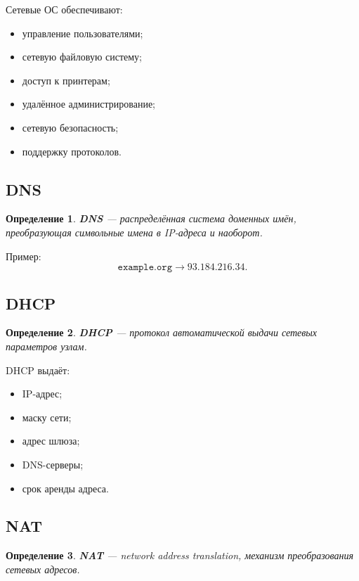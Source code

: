 \documentclass[12pt,a4paper]{article}
\newtheorem{definition}{Определение}
\begin{document}
Сетевые ОС обеспечивают:
\begin{itemize}
    \item управление пользователями;
    \item сетевую файловую систему;
    \item доступ к принтерам;
    \item удалённое администрирование;
    \item сетевую безопасность;
    \item поддержку протоколов.
\end{itemize}

\subsection{DNS}

\begin{definition}
\textbf{DNS} --- распределённая система доменных имён, преобразующая символьные имена в IP-адреса и наоборот.
\end{definition}

Пример:
\[
\texttt{example.org} \rightarrow 93.184.216.34.
\]

\subsection{DHCP}

\begin{definition}
\textbf{DHCP} --- протокол автоматической выдачи сетевых параметров узлам.
\end{definition}

DHCP выдаёт:
\begin{itemize}
    \item IP-адрес;
    \item маску сети;
    \item адрес шлюза;
    \item DNS-серверы;
    \item срок аренды адреса.
\end{itemize}

\subsection{NAT}

\begin{definition}
\textbf{NAT} --- network address translation, механизм преобразования сетевых адресов.
\end{definition}
\end{document}
